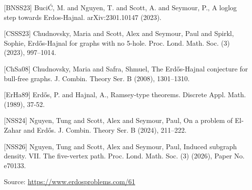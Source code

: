 \documentclass{article}
\begin{document}
 [BNSS23] Buci\'C, M. and Nguyen, T. and Scott, A. and Seymour, P., A loglog step towards Erdos-Hajnal. arXiv:2301.10147 (2023).
 
 [CSSS23] Chudnovsky, Maria and Scott, Alex and Seymour, Paul and
Spirkl, Sophie, Erd\H{o}s-{H}ajnal for graphs with no 5-hole. Proc. Lond. Math. Soc. (3) (2023), 997--1014.
 
 [ChSa08] Chudnovsky, Maria and Safra, Shmuel, The {E}rd\H os-{H}ajnal conjecture for bull-free graphs. J. Combin. Theory Ser. B (2008), 1301--1310.
 
 [ErHa89] Erd\H{o}s, P. and Hajnal, A., Ramsey-type theorems. Discrete Appl. Math. (1989), 37-52.
 
 [NSS24] Nguyen, Tung and Scott, Alex and Seymour, Paul, On a problem of {E}l-{Z}ahar and {E}rd\H{o}s. J. Combin. Theory Ser. B (2024), 211--222.
 
 [NSS26] Nguyen, Tung and Scott, Alex and Seymour, Paul, Induced subgraph density. {VII}. The five-vertex path. Proc. Lond. Math. Soc. (3) (2026), Paper No. e70133.

\bigskip
\noindent\small{Source: \url{https://www.erdosproblems.com/61}}
\end{document}
